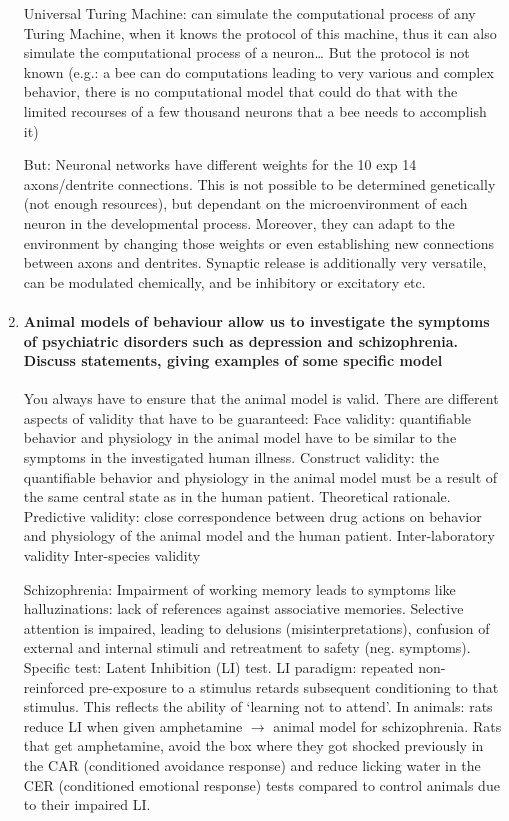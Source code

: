 \documentclass[12pt,article,oneside,a4paper]{memoir}
\begin{document}
\begin{enumerate}
	Universal Turing Machine: can simulate the computational process of any Turing Machine, when it knows the protocol of this machine, thus it can also simulate the computational process of a neuron… But the protocol is not known (e.g.: a bee can do computations leading to very various and complex behavior, there is no computational model that could do that with the limited recourses of a few thousand neurons that a bee needs to accomplish it)

	But: Neuronal networks have different weights for the 10 exp 14 axons/dentrite connections. This is not possible to be determined genetically (not enough resources), but dependant on the microenvironment of each neuron in the developmental process. Moreover, they can adapt to the environment by changing those weights or even establishing new connections between axons and dentrites.
	Synaptic release is additionally very versatile, can be modulated chemically, and be inhibitory or excitatory etc.
	
\item \paragraph{Animal models of behaviour allow us to investigate the symptoms of psychiatric disorders such as depression and schizophrenia. Discuss statements, giving examples of some specific model}

You always have to ensure that the animal model is valid. There are different aspects of validity that have to be guaranteed:
Face validity: quantifiable behavior and physiology in the animal model have to be similar to the symptoms in the investigated human illness.
Construct validity: the quantifiable behavior and physiology in the animal model must be a result of the same central state as in the human patient. Theoretical rationale.
Predictive validity: close correspondence between drug actions on behavior and physiology of the animal model and the human patient.
Inter-laboratory validity
Inter-species validity

 Schizophrenia:
Impairment of working memory leads to symptoms like halluzinations: lack of references against associative memories.
	Selective attention is impaired, leading to delusions (misinterpretations), confusion of external and internal stimuli and retreatment to safety (neg. symptoms). 
Specific test: Latent Inhibition (LI) test. LI paradigm: repeated non-reinforced pre-exposure to a stimulus retards subsequent conditioning to that stimulus. This reflects the ability of ‘learning not to attend’. In animals: rats reduce LI when given amphetamine $\rightarrow$ animal model for schizophrenia. Rats that get amphetamine, avoid the box where they got shocked previously in the CAR (conditioned avoidance response) and reduce licking water in the CER (conditioned emotional response) tests compared to control animals due to their impaired LI.



\end{enumerate}
\end{document}
